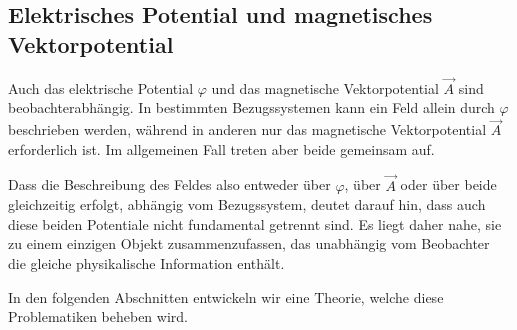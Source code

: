 \subsection{Elektrisches Potential und magnetisches Vektorpotential}
\label{maxwell:gedankenexperiment:potentiale}

Auch das elektrische Potential \( \varphi \) und das magnetische Vektorpotential \( \vec{A} \) sind beobachterabhängig.
In bestimmten Bezugssystemen kann ein Feld allein durch \( \varphi \) beschrieben werden, während in anderen nur das magnetische Vektorpotential \( \vec{A} \) erforderlich ist. Im allgemeinen Fall treten aber beide gemeinsam auf.

Dass die Beschreibung des Feldes also entweder über \( \varphi \), über \( \vec{A} \) oder über beide gleichzeitig erfolgt, abhängig vom Bezugssystem, deutet darauf hin, dass auch diese beiden Potentiale nicht fundamental getrennt sind.
Es liegt daher nahe, sie zu einem einzigen Objekt zusammenzufassen, das unabhängig vom Beobachter die gleiche physikalische Information enthält.

In den folgenden Abschnitten entwickeln wir eine Theorie, welche diese Problematiken beheben wird.




